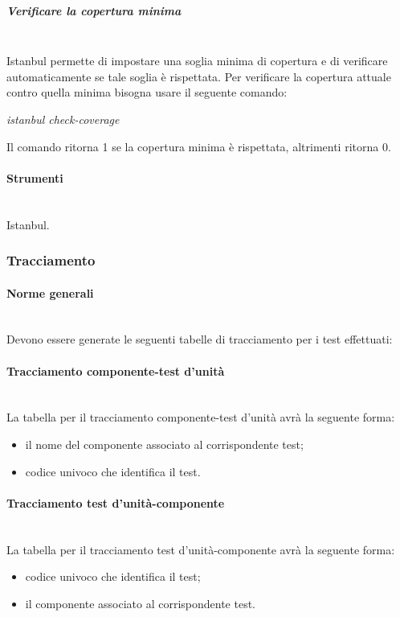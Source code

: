 \subparagraph{Verificare la copertura minima} \hfill \\
Istanbul permette di impostare una soglia minima di copertura e di verificare automaticamente se tale soglia è rispettata.
Per verificare la copertura attuale contro quella minima bisogna usare il seguente comando:\\
\begin{center}
\textit{istanbul check-coverage}\\
\end{center}
Il comando ritorna 1 se la copertura minima è rispettata, altrimenti ritorna 0.


\paragraph{Strumenti} \hfill \\
Istanbul.


\subsubsection{Tracciamento}

\paragraph{Norme generali} \hfill \\
Devono essere generate le seguenti tabelle di tracciamento per i test effettuati:

\paragraph{Tracciamento componente-test d'unità} \hfill \\
La tabella per il tracciamento componente-test d'unità avrà la seguente forma:
\begin{itemize}
\item {} il nome del componente associato al corrispondente test;
\item {}codice univoco che identifica il test.
\end{itemize}

\paragraph{Tracciamento test d'unità-componente} \hfill \\
La tabella per il tracciamento test d'unità-componente avrà la seguente forma:
\begin{itemize}
\item {}codice univoco che identifica il test;
\item {} il componente associato al corrispondente test.
\end{itemize}



